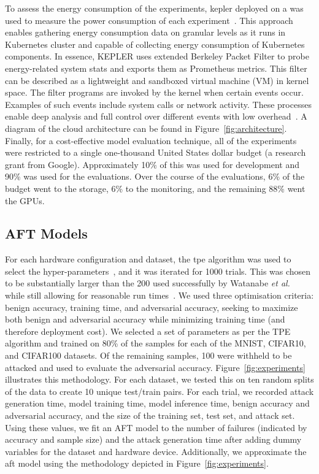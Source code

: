 \documentclass[sn-mathphys-num]{sn-jnl}%
\begin{document}
To assess the energy consumption of the experiments, \Gls{kepler} deployed on a was used to measure the power consumption of each experiment~\cite{amaral2023kepler}. This approach enables gathering energy consumption data on granular levels as it runs in Kubernetes cluster and capable of collecting energy consumption of Kubernetes components. In essence, KEPLER uses extended Berkeley Packet Filter to probe energy-related system stats and exports them as Prometheus metrics. This filter can be described as a lightweight and sandboxed virtual machine (VM) in kernel space. The filter programs are invoked by the kernel when certain events occur. Examples of such events include system calls or network activity. These processes enable deep analysis and full control over different events with low overhead~\cite{sedghpour@ebpf}. A diagram of the cloud architecture can be found in Figure~\ref{fig:architecture}. Finally, for a cost-effective model evaluation technique, all of the experiments were restricted to a single one-thousand United States dollar budget (a research grant from Google). Approximately 10\% of this was used for development and 90\% was used for the evaluations.
Over the course of the evaluations, 6\% of the budget went to the storage, 6\% to the monitoring, and the remaining 88\% went the GPUs.



\subsection{AFT Models}

For each hardware configuration and dataset, the \acrshort{tpe} algorithm was used to select the hyper-parameters~\cite{ozaki2020multiobjective,zitzler2008quality}, and it was iterated for 1000 trials. This was chosen to be substantially larger than the 200 used successfully by Watanabe \textit{et al.}~\cite{tpe_params} while still allowing for reasonable run times~\cite{legriel2010approximating}.
We used three optimisation criteria: benign accuracy, training time, and adversarial accuracy, seeking to maximize both benign and adversarial accuracy while minimizing training time (and therefore deployment cost). We selected a set of parameters as per the TPE algorithm and trained on 80\% of the samples for each of the MNIST, CIFAR10, and CIFAR100 datasets. Of the remaining samples, 100 were withheld to be attacked and used to evaluate the adversarial accuracy. Figure~\ref{fig:experiments} illustrates this methodology. For each dataset, we tested this on ten random splits of the data to create 10 unique test/train pairs. For each trial, we recorded attack generation time, model training time, model inference time, benign accuracy and adversarial accuracy, and the size of the training set, test set, and attack set. Using these values, we fit an AFT model to the number of failures (indicated by accuracy and sample size) and the attack generation time after adding dummy variables for the dataset and hardware device. Additionally, we approximate the \acrshort{aft} model using the methodology depicted in Figure~\ref{fig:experiments}.
\end{document}

